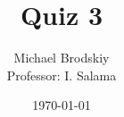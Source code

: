 


\title{Quiz 3}
\date{\today}
\author{Michael Brodskiy\\ \small Professor: I. Salama}



\maketitle

